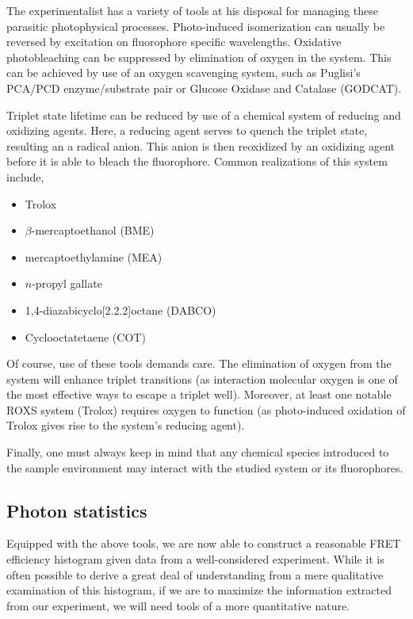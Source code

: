 \documentclass{article}
\newcommand{\refneeded}{\todo[color=green!20]{Referenced needed.}}
\begin{document}
The experimentalist has a variety of tools at his disposal for managing
these parasitic photophysical processes. Photo-induced isomerization
can usually be reversed by excitation on fluorophore specific
wavelengths\cite{Fan2011}. Oxidative photobleaching can be suppressed
by elimination of oxygen in the system. This can be achieved by use of
an oxygen scavenging system, such as Puglisi's PCA/PCD
enzyme/substrate pair\cite{Aitkin2008} or Glucose Oxidase and Catalase
(GODCAT)\refneeded.

Triplet state lifetime can be reduced by use of a chemical system of
reducing and oxidizing agents\cite{Vogelsang2008}. Here, a reducing
agent serves to quench the triplet state, resulting an a radical
anion. This anion is then reoxidized by an oxidizing agent before it
is able to bleach the fluorophore. Common realizations of this system
include\cite{Dave2009},
\begin{itemize}
\item Trolox\cite{Rasnik2006}
\item $\beta$-mercaptoethanol (BME)
\item mercaptoethylamine (MEA)
\item $n$-propyl gallate
\item 1,4-diazabicyclo[2.2.2]octane (DABCO)
\item Cyclooctatetaene (COT)
\end{itemize}

Of course, use of these tools demands care. The elimination of oxygen
from the system will enhance triplet transitions (as interaction
molecular oxygen is one of the most effective ways to escape a triplet
well\cite{Campos2011}). Moreover, at least one notable ROXS system
(Trolox) requires oxygen to function (as photo-induced oxidation of
Trolox gives rise to the system's reducing agent\cite{Cordes2009}).

Finally, one must always keep in mind that any chemical species
introduced to the sample environment may interact with the studied
system or its fluorophores.

\subsection{Photon statistics}
Equipped with the above tools, we are now able to construct a
reasonable FRET efficiency histogram given data from a well-considered
experiment. While it is often possible to derive a great deal of
understanding from a mere qualitative examination of this histogram,
if we are to maximize the information extracted from our experiment,
we will need tools of a more quantitative nature.
\end{document}
